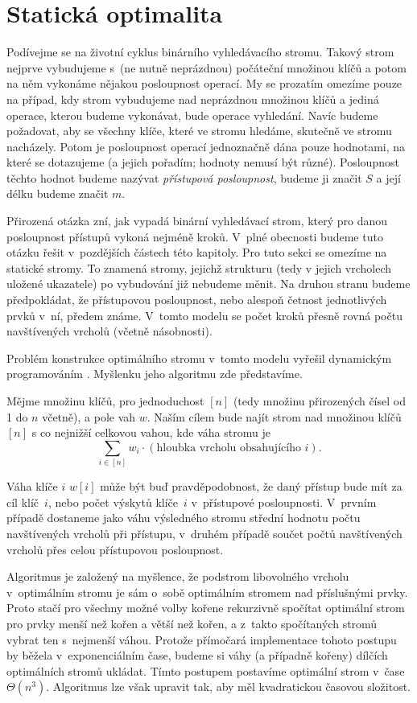 \section{Statická optimalita}\label{sec:staticoptimality}

Podívejme se na životní cyklus binárního vyhledávacího stromu. Takový strom
nejprve vybudujeme s~(ne nutně neprázdnou) počáteční množinou klíčů
a potom na něm vykonáme nějakou posloupnost operací. My se prozatím omezíme
pouze na případ, kdy strom vybudujeme nad neprázdnou množinou klíčů a jediná
operace, kterou budeme vykonávat, bude operace vyhledání. Navíc budeme
požadovat, aby se všechny klíče, které ve stromu hledáme, skutečně ve stromu nacházely.
Potom je posloupnost operací jednoznačně dána pouze hodnotami, na které se
dotazujeme (a jejich pořadím; hodnoty nemusí být různé). Posloupnost těchto
hodnot budeme nazývat \emph{přístupová posloupnost}, budeme ji značit $S$ a
její délku budeme značit $m$.

Přirozená otázka zní, jak vypadá binární vyhledávací strom, který pro danou
posloupnost přístupů vykoná nejméně kroků. V~plné obecnosti budeme tuto otázku řešit v~pozdějších částech této kapitoly. Pro tuto sekci se omezíme na statické
stromy. To znamená stromy, jejichž strukturu (tedy v jejich vrcholech uložené
ukazatele) po vybudování již nebudeme měnit. Na druhou stranu budeme
předpokládat, že přístupovou posloupnost, nebo alespoň četnost jednotlivých
prvků v~ní, předem známe. V~tomto modelu se počet kroků přesně rovná počtu
navštívených vrcholů (včetně násobnosti).

Problém konstrukce optimálního stromu v~tomto modelu vyřešil dynamickým
programováním \citet{staticoptimality}. Myšlenku jeho algoritmu zde představíme.

Mějme množinu klíčů, pro jednoduchost $[n]$ (tedy
množinu přirozených čísel od 1 do $n$ včetně), a pole vah $w$. 
Naším cílem bude najít strom nad množinou klíčů $[n]$ s co nejnižší celkovou vahou, kde váha stromu je $$\sum_{i\in [n]}w_i\cdot (\text{hloubka vrcholu obsahujícího $i$}).$$ 

Váha klíče
$i$ $w[i]$ může být buď pravděpodobnost, že daný přístup bude mít za
cíl klíč~$i$, nebo počet výskytů klíče~$i$ v~přístupové
posloupnosti. V~prvním případě dostaneme jako váhu výsledného stromu střední
hodnotu počtu navštívených vrcholů při přístupu, v~druhém případě součet počtů navštívených vrcholů přes
celou přístupovou posloupnost.

Algoritmus je založený na myšlence, že podstrom libovolného vrcholu
v~optimálním stromu je sám o~sobě optimálním stromem nad příslušnými prvky. Proto
stačí pro všechny možné volby kořene rekurzivně spočítat optimální strom pro
prvky menší než kořen a větší než kořen, a z~takto spočítaných stromů vybrat
ten s~nejmenší váhou. Protože přímočará implementace tohoto postupu by běžela
v~exponenciálním čase, budeme si váhy (a případně kořeny) dílčích optimálních
stromů ukládat. Tímto postupem postavíme optimální strom
v~čase $\Theta(n^3)$. Algoritmus lze však upravit tak, aby měl kvadratickou časovou složitost.



